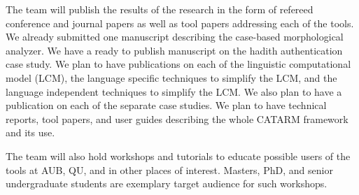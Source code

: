 \documentclass[12pt]{article}
\begin{document}
The team will publish the results of the research in the form 
of refereed conference and journal papers as well as tool papers 
addressing each of the tools. 
We already submitted one manuscript describing the case-based
morphological analyzer. 
We have a ready to publish manuscript on the hadith authentication
case study. 
We plan to have publications on each of the 
linguistic computational model (LCM), the language specific techniques
to simplify the LCM, and the language independent techniques to simplify
the LCM. 
We also plan to have a publication on each of the separate case 
studies. 
We plan to have technical reports, tool papers, and user
guides describing
the whole CATARM framework and its use. 

The team will also hold workshops and tutorials 
to educate possible users of the
tools at AUB, QU, and in other places of interest. 
Masters,  PhD, and senior undergraduate students are 
exemplary target audience for such workshops.

\pagebreak
{}
%
%

%
{\small
  
}
\end{document}
